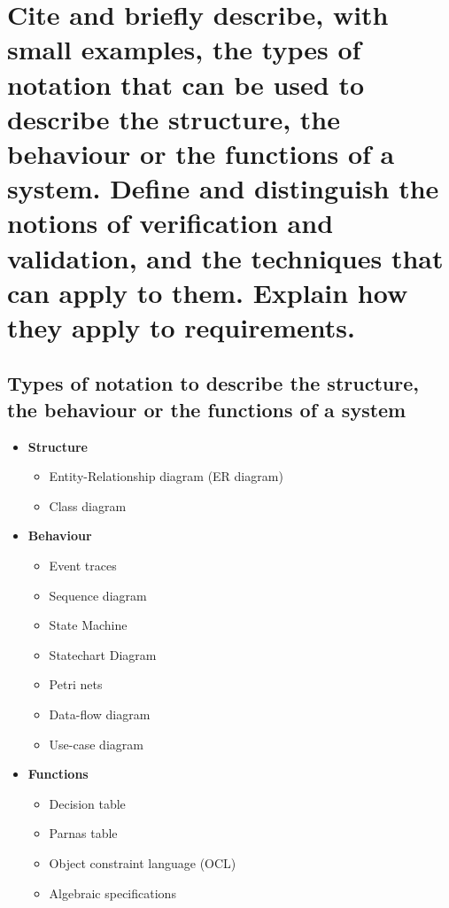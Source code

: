 \clearpage{}

\section{Cite and briefly describe, with small examples, the types of
notation that can be used to describe the structure, the behaviour or the
functions of a system. Define and distinguish the notions of verification
and validation, and the techniques that can apply to them. Explain how
they apply to requirements.}

\subsection{Types of notation to describe the structure, the behaviour or the functions
of a system}

\begin{itemize}
    \item \textbf{Structure}
        \begin{itemize}
            \item Entity-Relationship diagram (ER diagram)
            \item Class diagram
        \end{itemize}

    \item \textbf{Behaviour}
        \begin{itemize}
            \item Event traces
            \item Sequence diagram
            \item State Machine
            \item Statechart Diagram
            \item Petri nets
            \item Data-flow diagram
            \item Use-case diagram
        \end{itemize}

    \item \textbf{Functions}
        \begin{itemize}
            \item Decision table
            \item Parnas table
            \item Object constraint language (OCL)
            \item Algebraic specifications
        \end{itemize}
\end{itemize}


